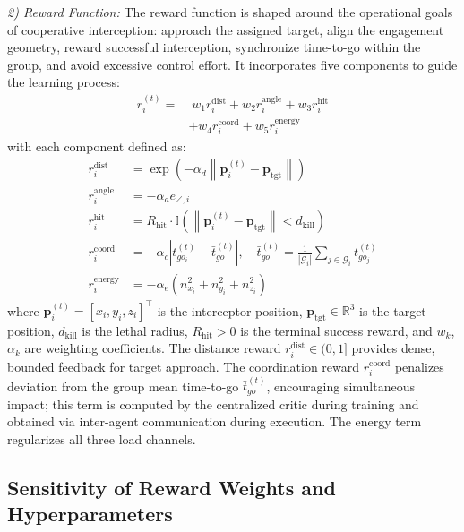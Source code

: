 \documentclass[lettersize,journal]{IEEEtran}
\begin{document}
\emph{2) Reward Function:} The reward function is shaped around the operational goals of cooperative interception: approach the assigned target, align the engagement geometry, reward successful interception, synchronize time-to-go within the group, and avoid excessive control effort. It incorporates five components to guide the learning process:
\begin{equation}
\label{eq:reward_function}
\begin{split}
r_i^{(t)} =& \; w_1 r_i^{\text{dist}} + w_2 r_i^{\text{angle}} + w_3 r_i^{\text{hit}} \\
&+ w_4 r_i^{\text{coord}} + w_5 r_i^{\text{energy}}
\end{split}
\end{equation}
with each component defined as:
\begin{align}
r_i^{\text{dist}} &= \exp\!\left(-\alpha_d \left\|\mathbf{p}_i^{(t)} - \mathbf{p}_{\text{tgt}}\right\|\right) \label{eq:r_dist}\\
r_i^{\text{angle}} &= -\alpha_a e_{\angle,i} \label{eq:r_angle}\\
r_i^{\text{hit}} &= R_{\text{hit}} \cdot \mathbb{I}\!\left(\left\|\mathbf{p}_i^{(t)} - \mathbf{p}_{\text{tgt}}\right\| < d_{\text{kill}}\right) \label{eq:r_hit}\\
r_i^{\text{coord}} &= -\alpha_c \left| t_{go_i}^{(t)} - \bar{t}_{go}^{(t)} \right|, \quad \bar{t}_{go}^{(t)} = \frac{1}{|\mathcal{G}_i|}\sum_{j \in \mathcal{G}_i} t_{go_j}^{(t)} \label{eq:r_coord}\\
r_i^{\text{energy}} &= -\alpha_e \left(n_{x_i}^2 + n_{y_i}^2+n_{z_i}^2\right) \label{eq:r_energy}
\end{align}
where $\mathbf{p}_i^{(t)} = [x_i,y_i,z_i]^\top$ is the interceptor
position, $\mathbf{p}_{\text{tgt}}\in\mathbb R^3$ is the target position,
$d_{\text{kill}}$ is the lethal radius, $R_{\text{hit}} > 0$ is the terminal
success reward, and $w_k$, $\alpha_k$ are weighting coefficients. The distance
reward $r_i^{\text{dist}} \in (0,1]$ provides dense, bounded feedback for target
approach. The coordination reward $r_i^{\text{coord}}$ penalizes deviation from
the group mean time-to-go $\bar{t}_{go}^{(t)}$, encouraging simultaneous impact;
this term is computed by the centralized critic during training and obtained
via inter-agent communication during execution. The energy term regularizes
all three load channels.

\subsection{Sensitivity of Reward Weights and Hyperparameters}
\label{subsec:reward_sensitivity}
\end{document}
